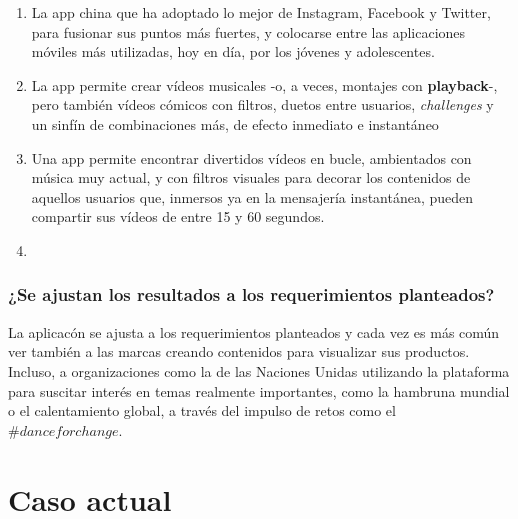 \documentclass[titlepage,a4paper,twoside]{article}
\begin{document}
    
    \begin{enumerate}
    	\item La app china que ha adoptado lo mejor de Instagram, Facebook y Twitter, para fusionar sus puntos más fuertes, y colocarse entre las aplicaciones móviles más utilizadas, hoy en día, por los jóvenes y adolescentes.
    	\item La app permite crear vídeos musicales -o, a veces, montajes con \textbf{playback}-, pero también vídeos cómicos con filtros, duetos entre usuarios, \textit{challenges} y un sinfín de combinaciones más, de efecto inmediato e instantáneo
    	\item Una app permite encontrar divertidos vídeos en bucle, ambientados con música muy actual, y con filtros visuales para decorar los contenidos de aquellos usuarios que, inmersos ya en la mensajería instantánea, pueden compartir sus vídeos de entre 15 y 60 segundos.
    	\item 
    \end{enumerate}
    
    
    \subsubsection{¿Se ajustan los resultados a los requerimientos planteados?}
    
    La aplicacón se ajusta a los requerimientos planteados y cada vez es más común ver también a las marcas creando contenidos para visualizar sus productos. Incluso, a organizaciones como la de las Naciones Unidas utilizando la plataforma para suscitar interés en temas realmente importantes, como la hambruna mundial o el calentamiento global, a través del impulso de retos como el $\#danceforchange.$
    
    
    \section{Caso actual}
    
\end{document}

